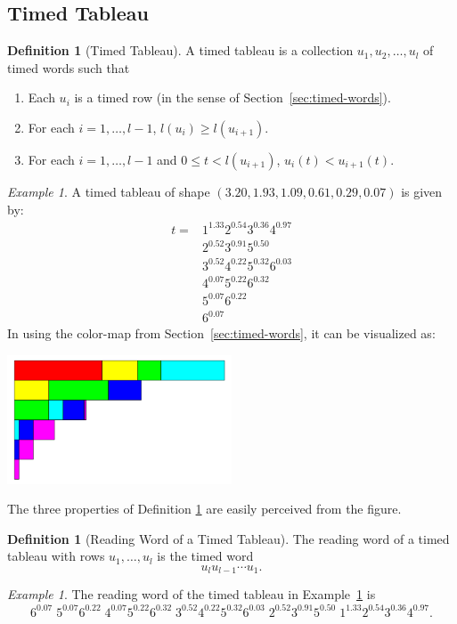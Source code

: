 \documentclass[10pt]{amsproc}
\theoremstyle{definition}
\newtheorem{definition}[theorem]{Definition}
\theoremstyle{remark}
\newtheorem{example}[theorem]{Example}
\begin{document}
\subsection{Timed Tableau}
\label{sec:Timed-Tableau}
\begin{definition}
  [Timed Tableau]
  \label{definition:timed-tableau}
  A timed tableau is a collection $u_1,u_2,\dotsc, u_l$ of timed words such that
  \begin{enumerate}
  \item Each $u_i$ is a timed row (in the sense of Section~\ref{sec:timed-words}).
  \item For each $i=1,\dotsc,l-1$, $l(u_i)\geq l(u_{i+1})$.
  \item For each $i=1,\dotsc,l-1$ and $0\leq t<l(u_{i+1})$, $u_i(t)<u_{i+1}(t)$.
  \end{enumerate}
\end{definition}
\begin{example}
  \label{example:timed-tableau}
  A timed tableau of shape $(3.20,1.93,1.09,0.61,0.29,0.07)$ is given by:
  \begin{align*}
    t = & 1^{1.33}2^{0.54}3^{0.36}4^{0.97}\\
    & 2^{0.52}3^{0.91}5^{0.50}\\
    &3^{0.52}4^{0.22}5^{0.32}6^{0.03}\\
    &4^{0.07}5^{0.22}6^{0.32}\\
    &5^{0.07}6^{0.22}\\
    &6^{0.07}
  \end{align*}
  In using the color-map from Section~\ref{sec:timed-words}, it can be visualized as:
  \begin{center}
    \includegraphics[width=0.5\textwidth]{tableau.png}
  \end{center}
  The three properties of Definition \ref{definition:timed-tableau} are easily perceived from the figure.
\end{example}
\begin{definition}
  [Reading Word of a Timed Tableau]
  The reading word of a timed tableau with rows $u_1,\dotsc,u_l$ is the timed word
  \begin{displaymath}
    u_l u_{l-1}\dotsb u_1.
  \end{displaymath}
\end{definition}
\begin{example}
  The reading word of the timed tableau in Example~\ref{example:timed-tableau} is
  \begin{displaymath}
    6^{0.07}\;5^{0.07}6^{0.22}\;4^{0.07}5^{0.22}6^{0.32}\;3^{0.52}4^{0.22}5^{0.32}6^{0.03}\;2^{0.52}3^{0.91}5^{0.50}\;1^{1.33}2^{0.54}3^{0.36}4^{0.97}.
  \end{displaymath}
\end{example}
\end{document}
